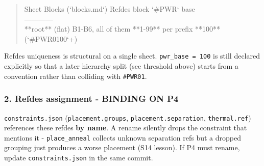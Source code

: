 \documentclass[11pt,a4paper]{article}
\begin{document}
\begin{quote}\small\ttfamily\raggedright
\textbar{} Sheet \textbar{} Blocks (`blocks.md`) \textbar{} Refdes block \textbar{} `\#PWR` base \textbar{}\\
\textbar{}---\textbar{}---\textbar{}---\textbar{}---\textbar{}\\
\textbar{} {*}{*}root{*}{*} (flat) \textbar{} B1-B6, all of them \textbar{} {*}{*}1-99{*}{*} per prefix \textbar{} {*}{*}100{*}{*} (`\#PWR0100`+) \textbar{}
\end{quote}
Refdes uniqueness is structural on a single sheet. \texttt{pwr\_base = 100} is still declared explicitly so that a later hierarchy split (see threshold above) starts from a convention rather than colliding with \texttt{\#PWR01}.

\subsubsection*{2. Refdes assignment - BINDING ON P4}
\texttt{constraints.json} (\texttt{placement.groups}, \texttt{placement.separation}, \texttt{thermal.ref}) references these refdes \textbf{by name}. A rename silently drops the constraint that mentions it - \texttt{place\_anneal} collects unknown separation refs but a dropped grouping just produces a worse placement (S14 lesson). If P4 must rename, update \texttt{constraints.json} in the same commit.
\end{document}
